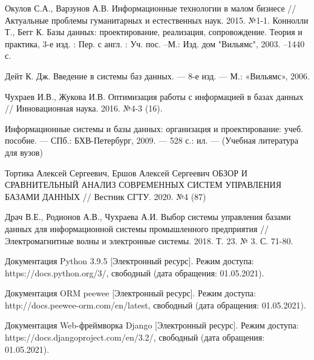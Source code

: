 	\makeatletter %
\def\@biblabel#1{#1. }
\makeatother
\begin{thebibliography}{10}
	 Окулов С.А., Варзунов А.В. Информационные технологии в малом бизнесе // Актуальные проблемы гуманитарных и естественных наук. 2015. №1-1.
	 Коннолли Т., Бегг К. Базы данных: проектирование, реализация, сопровождение. Теория и практика, 3-е изд. : Пер. с англ. : Уч. пос. –М.: Изд. дом "Вильямс", 2003. –1440 с.
	
	 Дейт К. Дж. Введение в системы баз данных. — 8-е изд. — М.:
	«Вильямс», 2006.
	
	 Чухраев И.В., Жукова И.В. Оптимизация работы с информацией в базах данных // Инновационная наука. 2016. №4-3 (16).
	
	 Информационные системы и базы данных: организация и проектирование: учеб. пособие. — СПб.: БХВ-Петербург, 2009. — 528 с.: ил. — (Учебная литература для вузов)
	
	 Тортика Алексей Сергеевич, Ершов Алексей Сергеевич ОБЗОР И СРАВНИТЕЛЬНЫЙ АНАЛИЗ СОВРЕМЕННЫХ СИСТЕМ УПРАВЛЕНИЯ БАЗАМИ ДАННЫХ // Вестник СГТУ. 2020. №4 (87)
	
	 Драч В.Е., Родионов А.В., Чухраева А.И. Выбор системы управления базами данных для информационной системы промышленного предприятия // Электромагнитные волны и электронные системы. 2018. Т. 23. № 3. С. 71-80.
	
	 Документация Python 3.9.5 [Электронный ресурс]. Режим доступа: https://docs.python.org/3/, свободный (дата обращения: 01.05.2021).
	
	 Документация ORM peewee [Электронный ресурс]. Режим доступа:
	http://docs.peewee-orm.com/en/latest, свободный (дата обращения: 01.05.2021).
	
	 Документация Web-фреймворка Django [Электронный ресурс]. Режим доступа: https://docs.djangoproject.com/en/3.2/, свободный (дата обращения: 01.05.2021).
\end{thebibliography}

